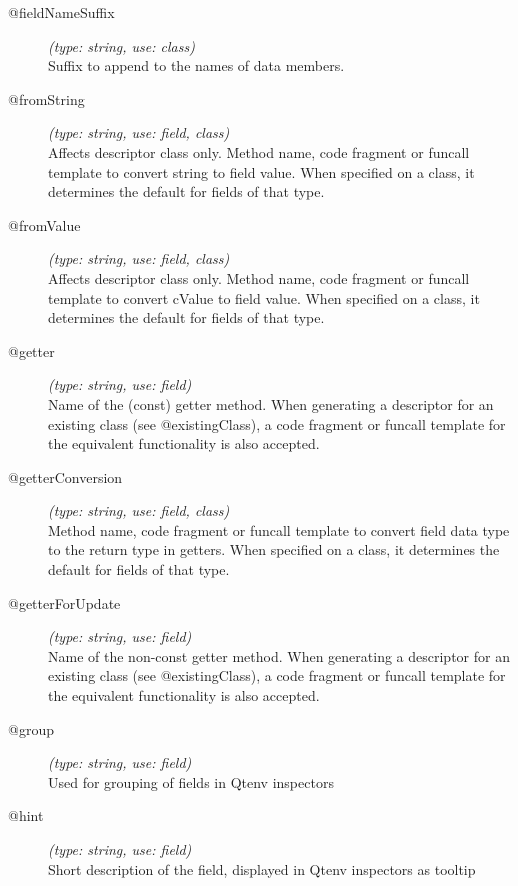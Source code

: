 \begin{description}
\item[@fieldNameSuffix] \textit{(type: string, use: class)} \\
  Suffix to append to the names of data members.

\item[@fromString] \textit{(type: string, use: field, class)} \\
  Affects descriptor class only. Method name, code fragment or funcall
  template to convert string to field value. When specified on a class, it
  determines the default for fields of that type.

\item[@fromValue] \textit{(type: string, use: field, class)} \\
  Affects descriptor class only. Method name, code fragment or funcall
  template to convert cValue to field value. When specified on a class, it
  determines the default for fields of that type.

\item[@getter] \textit{(type: string, use: field)} \\
  Name of the (const) getter method. When generating a descriptor for an
  existing class (see @existingClass), a code fragment or funcall template for
  the equivalent functionality is also accepted.

\item[@getterConversion] \textit{(type: string, use: field, class)} \\
  Method name, code fragment or funcall template to convert field data type to
  the return type in getters. When specified on a class, it determines the
  default for fields of that type.

\item[@getterForUpdate] \textit{(type: string, use: field)} \\
  Name of the non-const getter method. When generating a descriptor for an
  existing class (see @existingClass), a code fragment or funcall template for
  the equivalent functionality is also accepted.

\item[@group] \textit{(type: string, use: field)} \\
  Used for grouping of fields in Qtenv inspectors

\item[@hint] \textit{(type: string, use: field)} \\
  Short description of the field, displayed in Qtenv inspectors as tooltip


\end{description}
